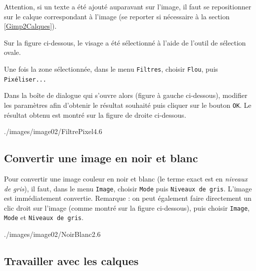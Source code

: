 \vspace{6pt}

Attention, si un texte a été ajouté auparavant sur l'image, il faut se repositionner sur le calque correspondant à l'image (se reporter si nécessaire à la section \vref{Gimp2Calques}). 

\vspace{6pt}

Sur la figure ci-dessous, le visage a été sélectionné à l'aide de l'outil de sélection ovale.


Une fois la zone sélectionnée, dans le menu \texttt{Filtres}, choisir \texttt{Flou}, puis \texttt{Pixéliser...}   


Dans la boîte de dialogue qui s'ouvre alors (figure à gauche ci-dessous), modifier les paramètres afin d'obtenir le résultat souhaité puis cliquer sur le bouton \texttt{OK}. Le résultat obtenu est montré sur la figure de droite ci-dessous.

%
              {./images/image02/FiltrePixel4}{.6\textwidth}




\subsection{Convertir une image en noir et blanc}\label{Gimp2ConvertirNoirBlanc}

 Pour convertir une image couleur en noir et blanc (le terme exact est en \emph{niveaux de gris}), il faut, dans le menu \texttt{Image}, choisir \texttt{Mode} puis \texttt{Niveaux de gris}. L'image est immédiatement convertie. Remarque : on peut également faire directement un clic droit sur l'image (comme montré sur la figure ci-dessous), puis choisir \texttt{Image}, \texttt{Mode} et \texttt{Niveaux de gris}.

%
              {./images/image02/NoirBlanc2}{.6\textwidth}

\subsection{Travailler avec les calques}\label{Gimp2Calques}

